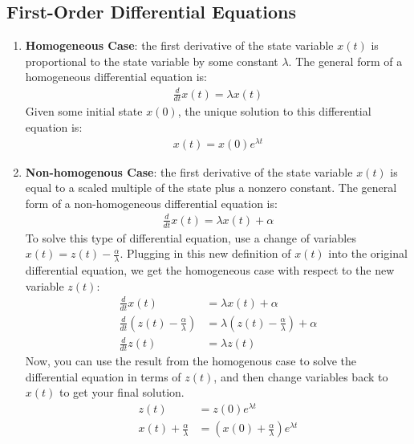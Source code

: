 \subsection*{First-Order Differential Equations}
\begin{enumerate}
    \item \textbf{Homogeneous Case}: the first derivative of the state variable $x(t)$ is proportional to the state variable by some constant $\lambda$. The general form of a homogeneous differential equation is:
    \begin{align*}
        \boxed{\frac{d}{dt} x(t) = \lambda x(t)}
    \end{align*}
    Given some initial state $x(0)$, the unique solution to this differential equation is:
    \begin{align*}
        \boxed{x(t) = x(0) e^{\lambda t}}
    \end{align*}

    \item \textbf{Non-homogenous Case}: the first derivative of the state variable $x(t)$ is equal to a scaled multiple of the state plus a nonzero constant. The general form of a non-homogeneous differential equation is:
    \begin{align*}
        \boxed{\frac{d}{dt} x(t) = \lambda x(t) + \alpha}
    \end{align*}
    To solve this type of differential equation, use a change of variables $x(t) = z(t) - \frac{\alpha}{\lambda}$. Plugging in this new definition of $x(t)$ into the original differential equation, we get the homogeneous case with respect to the new variable $z(t)$:
    \begin{align*}
        \frac{d}{dt} x(t) &= \lambda x(t) + \alpha \\
        \frac{d}{dt} (z(t) - \frac{\alpha}{\lambda}) &= \lambda (z(t) - \frac{\alpha}{\lambda}) + \alpha \\
        \frac{d}{dt} z(t) &= \lambda z(t)
    \end{align*}
    Now, you can use the result from the homogenous case to solve the differential equation in terms of $z(t)$, and then change variables back to $x(t)$ to get your final solution.
    \begin{align*}
        z(t) &= z(0) e^{\lambda t} \\
        x(t) + \frac{\alpha}{\lambda} &= (x(0) + \frac{\alpha}{\lambda}) e^{\lambda t} \\
    \end{align*}


\end{enumerate}
